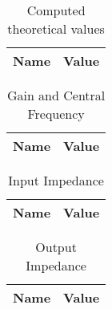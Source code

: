\begin{table}[H]
  \centering
  \begin{tabular}{|l|r|}
    \hline    
    {\bf Name} & {\bf Value} \\ \hline
    
  \end{tabular}
  \caption{Computed theoretical values}
  \label{tab:mat2}
\end{table}

\begin{table}[H]
  \centering
  \begin{tabular}{|l|r|}
    \hline    
    {\bf Name} & {\bf Value } \\ \hline
    
  \end{tabular}
  \caption{Gain and Central Frequency}
  \label{tab:ng3}
\end{table}


\begin{table}[H]
  \centering
  \begin{tabular}{|l|r|}
    \hline    
    {\bf Name} & {\bf Value } \\ \hline
    
  \end{tabular}
  \caption{Input Impedance}
  \label{tab:ng4}
\end{table}

\begin{table}[H]
  \centering
  \begin{tabular}{|l|r|}
    \hline    
    {\bf Name} & {\bf Value } \\ \hline
    
  \end{tabular}
  \caption{Output Impedance}
  \label{tab:ng4}
\end{table}









